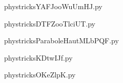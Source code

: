     

    \clearpage
    


    \newcommand{\CaptionFigYAFJooWuUmHJ}{<+Type your caption here+>}
    \begin{center}
        
    \end{center}
    phystricksYAFJooWuUmHJ.py

    

    \clearpage
    


    \newcommand{\CaptionFigDTFZooTlciUT}{<+Type your caption here+>}
    \begin{center}
        
    \end{center}
    phystricksDTFZooTlciUT.py

    

    \clearpage
    


    \newcommand{\CaptionFigParaboleHautMLbPQF}{<+Type your caption here+>}
    \begin{center}
        
    \end{center}
    phystricksParaboleHautMLbPQF.py

    

    \clearpage
    


    \newcommand{\CaptionFigKDtwIJf}{<+Type your caption here+>}
    \begin{center}
        
    \end{center}
    phystricksKDtwIJf.py

    

    \clearpage
    


    \newcommand{\CaptionFigOKeZlpK}{<+Type your caption here+>}
    \begin{center}
        
    \end{center}
    phystricksOKeZlpK.py

    

    \clearpage
    


